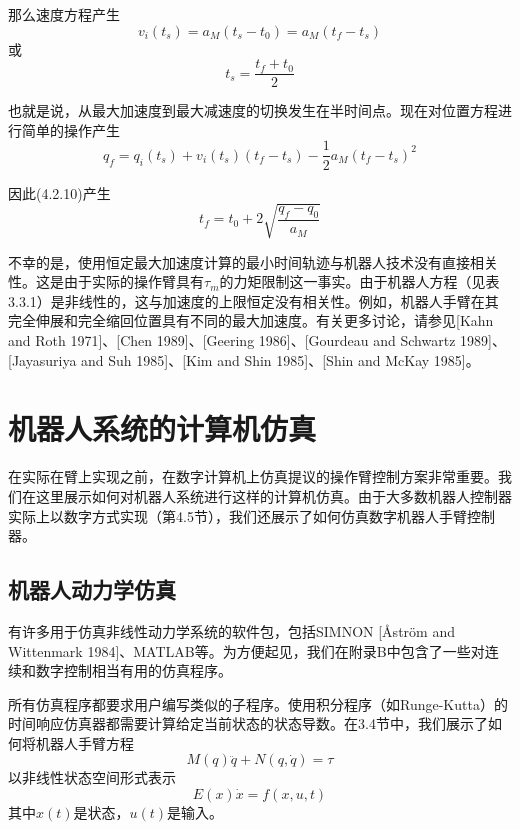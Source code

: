 \documentclass[UTF8]{ctexart}
\theoremstyle{definition}
\begin{document}
那么速度方程产生
\begin{equation}\label{eq:4.2.11}
    v_i(t_s) = a_M(t_s - t_0) = a_M(t_f - t_s)
\end{equation}
或
\begin{equation}\label{eq:4.2.12}
    t_s = \frac{t_f + t_0}{2}
\end{equation}

也就是说，从最大加速度到最大减速度的切换发生在半时间点。现在对位置方程进行简单的操作产生
\begin{equation}
    q_f = q_i(t_s) + v_i(t_s)(t_f - t_s) - \frac{1}{2}a_M(t_f - t_s)^2
\end{equation}

因此(4.2.10)产生
\begin{equation}
    t_f = t_0 + 2\sqrt{\frac{q_f - q_0}{a_M}}
\end{equation}

不幸的是，使用恒定最大加速度计算的最小时间轨迹与机器人技术没有直接相关性。这是由于实际的操作臂具有$\tau_m$的力矩限制这一事实。由于机器人方程（见表3.3.1）是非线性的，这与加速度的上限恒定没有相关性。例如，机器人手臂在其完全伸展和完全缩回位置具有不同的最大加速度。有关更多讨论，请参见[Kahn and Roth 1971]、[Chen 1989]、[Geering 1986]、[Gourdeau and Schwartz 1989]、[Jayasuriya and Suh 1985]、[Kim and Shin 1985]、[Shin and McKay 1985]。

\section{机器人系统的计算机仿真}

在实际在臂上实现之前，在数字计算机上仿真提议的操作臂控制方案非常重要。我们在这里展示如何对机器人系统进行这样的计算机仿真。由于大多数机器人控制器实际上以数字方式实现（第4.5节），我们还展示了如何仿真数字机器人手臂控制器。

\subsection{机器人动力学仿真}

有许多用于仿真非线性动力学系统的软件包，包括SIMNON [Åström and Wittenmark 1984]、MATLAB等。为方便起见，我们在附录B中包含了一些对连续和数字控制相当有用的仿真程序。

所有仿真程序都要求用户编写类似的子程序。使用积分程序（如Runge-Kutta）的时间响应仿真器都需要计算给定当前状态的状态导数。在3.4节中，我们展示了如何将机器人手臂方程
\begin{equation}\label{eq:4.3.1}
    M(q)\ddot{q} + N(q, \dot{q}) = \tau
\end{equation}
以非线性状态空间形式表示
\begin{equation}\label{eq:4.3.2}
    E(x)\dot{x} = f(x, u, t)
\end{equation}
其中$x(t)$是状态，$u(t)$是输入。
\end{document}

